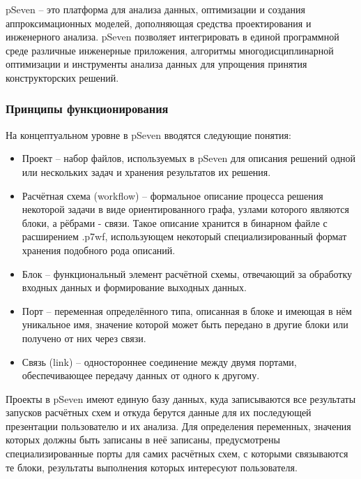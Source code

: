 \def\notedate{2021.11.06}
\def\currentauthor{Тришин И.В. (РК6)}%

\textsf{pSeven} -- это платформа для анализа данных, оптимизации и создания аппроксимационных моделей, дополняющая средства проектирования и инженерного анализа.
\textsf{pSeven} позволяет интегрировать в единой программной среде различные инженерные приложения, алгоритмы многодисциплинарной оптимизации и инструменты анализа данных для упрощения принятия конструкторских решений\cite{DatadvanceOffWebsite2021}.

\subsubsection{Принципы функционирования}

На концептуальном уровне в \textsf{pSeven} вводятся следующие понятия:
\begin{itemize}
    \item Проект -- набор файлов, используемых в \textsf{pSeven} для описания решений одной или нескольких задач и хранения результатов их решения.
    \item Расчётная схема (workflow) -- формальное описание процесса решения некоторой задачи в виде ориентированного графа, узлами которого являются блоки, а рёбрами - связи. Такое описание хранится в бинарном файле с расширением \textsf{.p7wf}, использующем некоторый специализированный формат хранения подобного рода описаний.
    \item Блок -- функциональный элемент расчётной схемы, отвечающий за обработку входных данных и формирование выходных данных.\cite{pSevenDocsWorkflow2021}
    \item Порт -- переменная определённого типа, описанная в блоке и имеющая в нём уникальное имя, значение которой может быть передано в другие блоки или получено от них через связи.
    \item Связь (link) -- одностороннее соединение между двумя портами, обеспечивающее передачу данных от одного к другому.
\end{itemize}

Проекты в \textsf{pSeven} имеют единую базу данных, куда записываются все результаты запусков расчётных схем и откуда берутся данные для их последующей презентации пользователю и их анализа. Для определения переменных, значения которых должны быть записаны в неё записаны, предусмотрены специализированные порты для самих расчётных схем, с которыми связываются те блоки, результаты выполнения которых интересуют пользователя.

